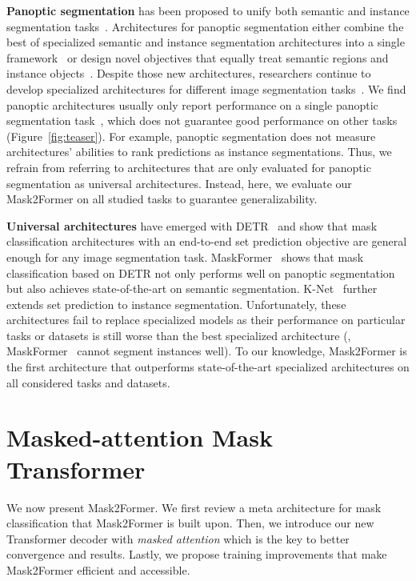 \documentclass[10pt,twocolumn,letterpaper]{article}
\newcommand{\modelname}{Mask2Former\xspace}
\newcommand{\modelnamelong}{Masked-attention Mask Transformer\xspace}
\newcommand{\figref}[1]{Figure~\ref{#1}}
\begin{document}
\noindent\textbf{Panoptic segmentation} has been proposed to unify both semantic and instance segmentation tasks~\cite{kirillov2017panoptic}. Architectures for panoptic segmentation either combine the best of specialized semantic and instance segmentation architectures into a single framework~\cite{xiong19upsnet,kirillov2019panopticfpn,cheng2020panoptic,li2021fully} or design novel objectives that equally treat semantic regions and instance objects~\cite{detr,wang2021max}. Despite those new architectures, researchers continue to develop specialized architectures for different image segmentation tasks~\cite{strudel2021segmenter,QueryInst}.
We find panoptic architectures usually only report performance on a single panoptic segmentation task~\cite{wang2021max}, which does not guarantee good performance on other tasks (\figref{fig:teaser}). For example, panoptic segmentation does not measure architectures' abilities to rank predictions as instance segmentations. Thus, we refrain from referring to architectures that are only evaluated for panoptic segmentation as universal architectures. Instead, here, we evaluate our \modelname on all studied tasks to guarantee generalizability.

\noindent\textbf{Universal architectures} have emerged with DETR~\cite{detr} and show that mask classification architectures with an end-to-end set prediction objective are general enough for any image segmentation task. 
MaskFormer~\cite{cheng2021maskformer} shows that mask classification based on DETR not only performs well on panoptic segmentation but also achieves state-of-the-art on semantic segmentation. K-Net~\cite{zhang2021knet} further extends set prediction to instance segmentation. Unfortunately, these architectures fail to replace specialized models as their performance on particular tasks or datasets is still worse than the best specialized architecture (\eg, MaskFormer~\cite{cheng2021maskformer} cannot segment instances well). To our knowledge, \modelname is the first
architecture that outperforms state-of-the-art specialized architectures on all considered tasks and datasets. 











 \section{\modelnamelong}
We now present \modelname.
We first review a  meta architecture for mask classification that \modelname is built upon.
Then, we introduce our new Transformer decoder with \emph{masked attention} which is the key to better convergence and results.
Lastly, we propose training improvements that make \modelname  efficient and accessible.
\end{document}
